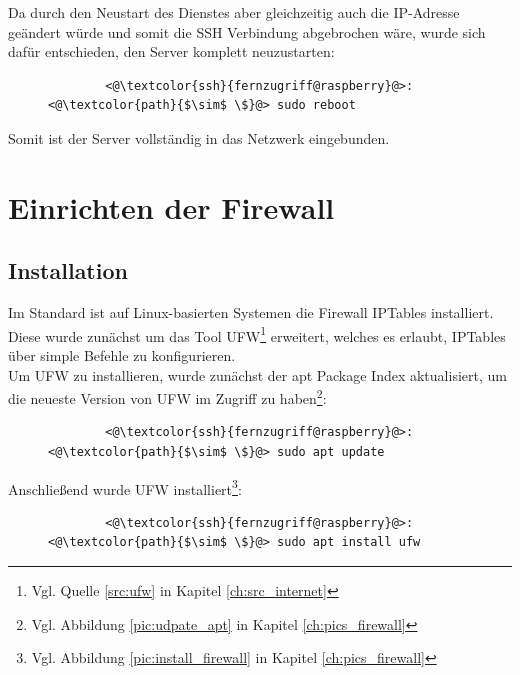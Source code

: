 \documentclass[a4paper, 11pt]{scrartcl}
\begin{document}
Da durch den Neustart des Dienstes aber gleichzeitig auch die IP-Adresse geändert würde und somit die SSH Verbindung abgebrochen wäre, wurde sich dafür entschieden,
den Server komplett neuzustarten:
\begin{figure}[H]
    \begin{mdframed}[backgroundcolor=bbg]
        \begin{lstlisting}
        <@\textcolor{ssh}{fernzugriff@raspberry}@>:<@\textcolor{path}{$\sim$ \$}@> sudo reboot
        \end{lstlisting}
    \end{mdframed}
    \label{lst:restart_raspi}
\end{figure}
Somit ist der Server vollständig in das Netzwerk eingebunden.



\section{Einrichten der Firewall}
\subsection{Installation}\label{ch:firewall_inst}
Im Standard ist auf Linux-basierten Systemen die Firewall IPTables installiert. Diese wurde zunächst um das Tool \glqq UFW\grqq{}\footnote{Vgl. Quelle \ref{src:ufw} in Kapitel \ref{ch:src_internet}}
erweitert, welches es erlaubt, IPTables über simple Befehle zu konfigurieren.
\\
Um UFW zu installieren, wurde zunächst der apt Package Index aktualisiert, um die neueste Version von UFW im Zugriff zu haben\footnote{Vgl. Abbildung \ref{pic:udpate_apt} in Kapitel \ref{ch:pics_firewall}}:
\begin{figure}[H]
    \begin{mdframed}[backgroundcolor=bbg]
        \begin{lstlisting}
        <@\textcolor{ssh}{fernzugriff@raspberry}@>:<@\textcolor{path}{$\sim$ \$}@> sudo apt update
        \end{lstlisting}
    \end{mdframed}
    \label{lst:update_apt}
\end{figure}
Anschließend wurde UFW installiert\footnote{Vgl. Abbildung \ref{pic:install_firewall} in Kapitel \ref{ch:pics_firewall}}:
\begin{figure}[H]
    \begin{mdframed}[backgroundcolor=bbg]
        \begin{lstlisting}
        <@\textcolor{ssh}{fernzugriff@raspberry}@>:<@\textcolor{path}{$\sim$ \$}@> sudo apt install ufw
        \end{lstlisting}
    \end{mdframed}
    \label{lst:install_ufw}
\end{figure}
\end{document}

